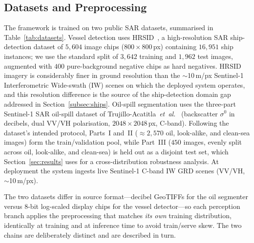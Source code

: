 \documentclass{ieeeaccess}
\begin{document}
\subsection{Datasets and Preprocessing}
\label{subsec:data}

The framework is trained on two public SAR datasets, summarised in Table~\ref{tab:datasets}. Vessel detection uses HRSID~\cite{4}, a high-resolution SAR ship-detection dataset of $5{,}604$ image chips ($800\times800$\,px) containing $16{,}951$ ship instances; we use the standard split of $3{,}642$ training and $1{,}962$ test images, augmented with $400$ pure-background negative chips as hard negatives. HRSID imagery is considerably finer in ground resolution than the $\sim$10\,m/px Sentinel-1 Interferometric Wide-swath (IW) scenes on which the deployed system operates, and this resolution difference is the source of the ship-detection domain gap addressed in Section~\ref{subsec:ships}. Oil-spill segmentation uses the three-part Sentinel-1 SAR oil-spill dataset of Trujillo-Acatitla~\textit{et~al.}~\cite{6} (backscatter $\sigma^0$ in decibels, dual VV/VH polarisation, $2048\times2048$\,px, C-band). Following the dataset's intended protocol, Parts~I and~II ($\approx2{,}570$ oil, look-alike, and clean-sea images) form the train/validation pool, while Part~III ($450$ images, evenly split across oil, look-alike, and clean-sea) is held out as a disjoint test set, which Section~\ref{sec:results} uses for a cross-distribution robustness analysis. At deployment the system ingests live Sentinel-1 C-band IW GRD scenes (VV/VH, $\sim$10\,m/px).

\label{subsec:prep}%
The two datasets differ in source format---decibel GeoTIFFs for the oil segmenter versus 8-bit log-scaled display chips for the vessel detector---so each perception branch applies the preprocessing that matches \emph{its own} training distribution, identically at training and at inference time to avoid train/serve skew. The two chains are deliberately distinct and are described in turn.
\end{document}

